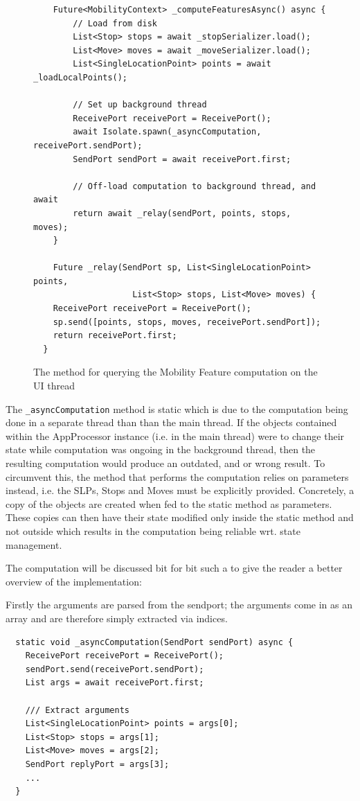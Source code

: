 \begin{figure}
    \centering
    \begin{verbatim}
    Future<MobilityContext> _computeFeaturesAsync() async {
        // Load from disk
        List<Stop> stops = await _stopSerializer.load();
        List<Move> moves = await _moveSerializer.load();
        List<SingleLocationPoint> points = await _loadLocalPoints();
        
        // Set up background thread
        ReceivePort receivePort = ReceivePort();
        await Isolate.spawn(_asyncComputation, receivePort.sendPort);
        SendPort sendPort = await receivePort.first;
        
        // Off-load computation to background thread, and await
        return await _relay(sendPort, points, stops, moves);
    }
    
    Future _relay(SendPort sp, List<SingleLocationPoint> points, 
                    List<Stop> stops, List<Move> moves) {
    ReceivePort receivePort = ReceivePort();
    sp.send([points, stops, moves, receivePort.sendPort]);
    return receivePort.first;
  }
    \end{verbatim}
    \caption{The method for querying the Mobility Feature computation on the UI thread}
    \label{fig:feature-comutation-code}
\end{figure}


The \verb|_asyncComputation| method is static which is due to the computation being done in a separate thread than than the main thread. If the objects contained within the AppProcessor instance (i.e. in the main thread) were to change their state while computation was ongoing in the background thread, then the resulting computation would produce an outdated, and or wrong result. To circumvent this, the method that performs the computation relies on parameters instead, i.e. the SLPs, Stops and Moves must be explicitly provided. Concretely, a copy of the objects are created when fed to the static method as parameters. These copies can then have their state modified only inside the static method and not outside which results in the computation being reliable wrt. state management. 

The computation will be discussed bit for bit such a to give the reader a better overview of the implementation:

Firstly the arguments are parsed from the sendport; the arguments come in as an array and are therefore simply extracted via indices.
\begin{verbatim}
  static void _asyncComputation(SendPort sendPort) async {
    ReceivePort receivePort = ReceivePort();
    sendPort.send(receivePort.sendPort);
    List args = await receivePort.first;

    /// Extract arguments
    List<SingleLocationPoint> points = args[0];
    List<Stop> stops = args[1];
    List<Move> moves = args[2];
    SendPort replyPort = args[3];
    ...
  }
\end{verbatim}

